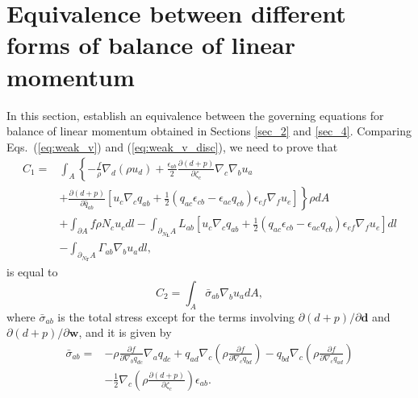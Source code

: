 \documentclass[12pt]{iopart}
\begin{document}
			
			
			
			\section{Equivalence between different forms of balance of linear momentum} \label{equivalence}
			
In this section,  establish an equivalence between the governing equations for balance of linear momentum obtained in Sections \ref{sec_2} and \ref{sec_4}. Comparing Eqs.~(\ref{eq:weak_v}) and (\ref{eq:weak_v_disc}), we need to prove that 
						\begin{eqnarray}
				C_1 = &\int_A \left\{-\frac{ f}{\rho} \nabla_d \left(\rho u_d\right) + \frac{\epsilon_{ab}}{2} \frac{\partial ( d+ p)}{\partial {\zeta}_c} \nabla_c \nabla_b {u}_a  \right. \nonumber \\ & \left. + \frac{\partial ( d+ p)}{\partial \widehat{q}_{ab}}  \left[ {u}_c\nabla_c{q}_{ab} + \frac{1}{2}\left({q}_{ac} {\epsilon}_{cb} -{\epsilon}_{ac}{q}_{cb} \right) {\epsilon}_{ef}\nabla_f{u}_e\right] \right\}\rho dA \nonumber\\
				&+  \int_{\partial A} f\rho N_c u_c dl - \int_{\partial_{N_{\bm{L}}} A} L_{ab} \left[ {u}_c\nabla_c{q}_{ab} + \frac{1}{2}\left({q}_{ac} {\epsilon}_{cb} -{\epsilon}_{ac}{q}_{cb} \right) {\epsilon}_{ef}\nabla_f{u}_e\right]dl \nonumber\\& -\int_{\partial_{N_{\bm{\Gamma}}} A} \Gamma_{ab} \nabla_b u_a dl , \label{eq:weak_v_disc_app}
\end{eqnarray}
 is equal to 
\begin{equation}
				C_2 = \int_A \bar{\sigma}_{ab}\nabla_b u_a dA, \label{eq:weak_v_app}
			\end{equation}
where $\bar{\sigma}_{ab}$ is the total stress except for the terms involving $\partial(d+p)/\partial\bm{d}$ and $\partial(d+p)/\partial\bm{w}$, and it is given by
\begin{eqnarray}
				\bar{\sigma}_{ab} = & -\rho\frac{\partial  f}{\partial \nabla_b q_{dc}} \nabla_a q_{dc}  +   q_{ad}  \nabla_c \left(\rho \frac{\partial f}{\partial \nabla_c {q}_{bd}}\right) - q_{bd}\nabla_c \left(\rho \frac{\partial f}{\partial \nabla_c {q}_{ad}}\right) \nonumber \\ &  -  \frac{1}{2} \nabla_c \left(\rho\frac{\partial (  d+p)}{\partial \zeta_c} \right) \epsilon_{ab}   .
	\end{eqnarray}
\end{document}
